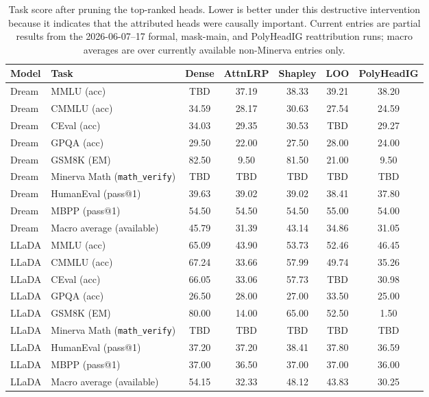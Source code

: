 \begin{table}[t]
\centering
\caption{Task score after pruning the top-ranked heads. Lower is better under this destructive intervention because it indicates that the attributed heads were causally important. Current entries are partial results from the 2026-06-07--17 formal, mask-main, and PolyHeadIG reattribution runs; macro averages are over currently available non-Minerva entries only.}
\label{tab:mask_main}
\begin{tabular}{llccccc}
\hline
\textbf{Model} & \textbf{Task} & \textbf{Dense} & \textbf{AttnLRP} & \textbf{Shapley} & \textbf{LOO} & \textbf{PolyHeadIG} \\
\hline
Dream & MMLU (acc) & TBD & 37.19 & 38.33 & 39.21 & 38.20 \\
Dream & CMMLU (acc) & 34.59 & 28.17 & 30.63 & 27.54 & 24.59 \\
Dream & CEval (acc) & 34.03 & 29.35 & 30.53 & TBD & 29.27 \\
Dream & GPQA (acc) & 29.50 & 22.00 & 27.50 & 28.00 & 24.00 \\
Dream & GSM8K (EM) & 82.50 & 9.50 & 81.50 & 21.00 & 9.50 \\
Dream & Minerva Math (\texttt{math\_verify}) & TBD & TBD & TBD & TBD & TBD \\
Dream & HumanEval (pass@1) & 39.63 & 39.02 & 39.02 & 38.41 & 37.80 \\
Dream & MBPP (pass@1) & 54.50 & 54.50 & 54.50 & 55.00 & 54.00 \\
Dream & Macro average (available) & 45.79 & 31.39 & 43.14 & 34.86 & 31.05 \\
LLaDA & MMLU (acc) & 65.09 & 43.90 & 53.73 & 52.46 & 46.45 \\
LLaDA & CMMLU (acc) & 67.24 & 33.66 & 57.99 & 49.74 & 35.26 \\
LLaDA & CEval (acc) & 66.05 & 33.06 & 57.73 & TBD & 30.98 \\
LLaDA & GPQA (acc) & 26.50 & 28.00 & 27.00 & 33.50 & 25.00 \\
LLaDA & GSM8K (EM) & 80.00 & 14.00 & 65.00 & 52.50 & 1.50 \\
LLaDA & Minerva Math (\texttt{math\_verify}) & TBD & TBD & TBD & TBD & TBD \\
LLaDA & HumanEval (pass@1) & 37.20 & 37.20 & 38.41 & 37.80 & 36.59 \\
LLaDA & MBPP (pass@1) & 37.00 & 36.50 & 37.00 & 37.00 & 36.00 \\
LLaDA & Macro average (available) & 54.15 & 32.33 & 48.12 & 43.83 & 30.25 \\
\hline
\end{tabular}
\end{table}

